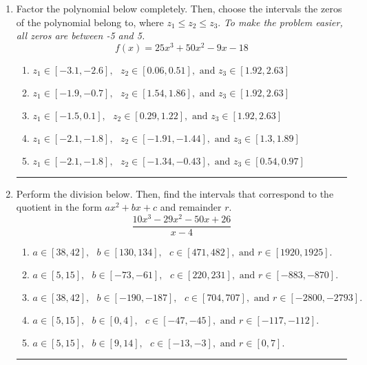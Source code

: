 \documentclass[14pt]{extbook}
\newcommand{\litem}[1]{\item#1\hspace*{-1cm}\rule{\textwidth}{0.4pt}}
\begin{document}
\begin{enumerate}
{\begin{enumerate}[label=\Alph*.]
\end{enumerate} }
\litem{
Factor the polynomial below completely. Then, choose the intervals the zeros of the polynomial belong to, where $z_1 \leq z_2 \leq z_3$. \textit{To make the problem easier, all zeros are between -5 and 5.}\[ f(x) = 25x^{3} +50 x^{2} -9 x -18 \]\begin{enumerate}[label=\Alph*.]
\item \( z_1 \in [-3.1, -2.6], \text{   }  z_2 \in [0.06, 0.51], \text{   and   } z_3 \in [1.92, 2.63] \)
\item \( z_1 \in [-1.9, -0.7], \text{   }  z_2 \in [1.54, 1.86], \text{   and   } z_3 \in [1.92, 2.63] \)
\item \( z_1 \in [-1.5, 0.1], \text{   }  z_2 \in [0.29, 1.22], \text{   and   } z_3 \in [1.92, 2.63] \)
\item \( z_1 \in [-2.1, -1.8], \text{   }  z_2 \in [-1.91, -1.44], \text{   and   } z_3 \in [1.3, 1.89] \)
\item \( z_1 \in [-2.1, -1.8], \text{   }  z_2 \in [-1.34, -0.43], \text{   and   } z_3 \in [0.54, 0.97] \)

\end{enumerate} }
\litem{
Perform the division below. Then, find the intervals that correspond to the quotient in the form $ax^2+bx+c$ and remainder $r$.\[ \frac{10x^{3} -29 x^{2} -50 x + 26}{x -4} \]\begin{enumerate}[label=\Alph*.]
\item \( a \in [38, 42], \text{   } b \in [130, 134], \text{   } c \in [471, 482], \text{   and   } r \in [1920, 1925]. \)
\item \( a \in [5, 15], \text{   } b \in [-73, -61], \text{   } c \in [220, 231], \text{   and   } r \in [-883, -870]. \)
\item \( a \in [38, 42], \text{   } b \in [-190, -187], \text{   } c \in [704, 707], \text{   and   } r \in [-2800, -2793]. \)
\item \( a \in [5, 15], \text{   } b \in [0, 4], \text{   } c \in [-47, -45], \text{   and   } r \in [-117, -112]. \)
\item \( a \in [5, 15], \text{   } b \in [9, 14], \text{   } c \in [-13, -3], \text{   and   } r \in [0, 7]. \)


\end{enumerate}}
\end{enumerate}
\end{document}
